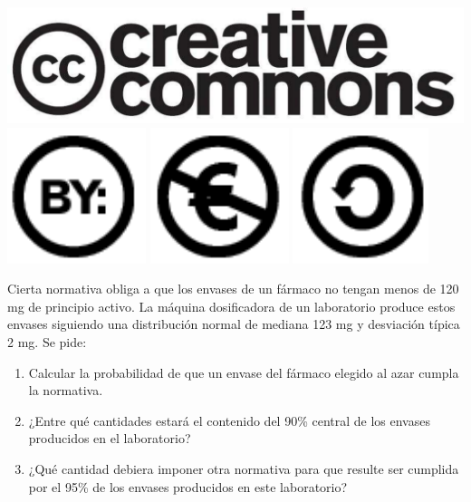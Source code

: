 \documentclass[aspectratio=149,10pt,xcolor=dvipsnames,t]{beamer}
\begin{document}
\begin{frame}[c]
\begin{center}
\biskip
\includegraphics[scale=0.07]{img/cc-logo}
\includegraphics[scale=0.2]{img/cc-by}
\includegraphics[scale=0.2]{img/cc-e}
\includegraphics[scale=0.2]{img/cc-c}
\end{center}
\end{frame}

\begin{frame}[c]
\large
Cierta normativa obliga a que los envases de un fármaco no tengan menos de 120 mg  de principio activo.
La máquina dosificadora de un laboratorio produce estos envases siguiendo una distribución normal de mediana 123 mg y
desviación típica 2 mg.
Se pide:
\begin{enumerate}
\item Calcular la probabilidad de que un envase del fármaco elegido al azar cumpla la normativa.
\item ¿Entre qué cantidades estará el contenido del 90\% central de los envases producidos en el laboratorio? 
\item ¿Qué cantidad debiera imponer otra normativa para que resulte ser cumplida por el 95\% de los envases producidos
en este laboratorio? 
\end{enumerate} 
\end{frame}
\end{document}
